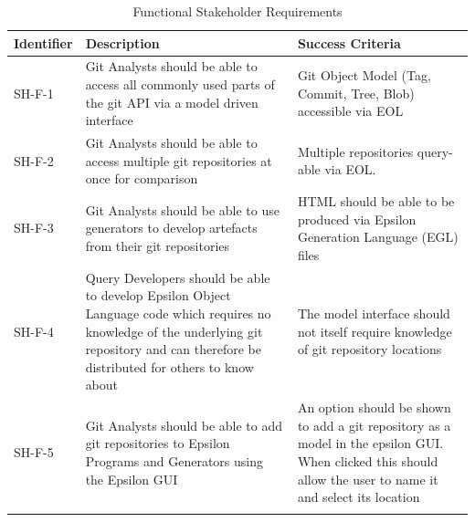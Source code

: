 \documentclass[11pt]{book}
\begin{document}
\begin{longtable}{|p{2cm}|p{7cm}|p{6cm}|}
\hline
\textbf{Identifier} & \textbf{Description} & \textbf{Success Criteria} \\ \hline
SH-F-1 & Git Analysts should be able to access all commonly used parts of the git API via a model driven interface &  Git Object Model (Tag, Commit, Tree, Blob) accessible via EOL \\ \hline
SH-F-2 & Git Analysts should be able to access multiple git repositories at once for comparison & Multiple repositories query-able via EOL.  \\ \hline
SH-F-3 & Git Analysts should be able to use generators to develop artefacts from their git repositories & HTML should be able to be produced via Epsilon Generation Language (EGL) files \\ \hline
SH-F-4 & Query Developers should be able to develop Epsilon Object Language code which requires no knowledge of the underlying git repository and can therefore be distributed for others to know about & The model interface should not itself require knowledge of git repository locations \\ \hline
SH-F-5 & Git Analysts should be able to add git repositories to Epsilon Programs and Generators using the Epsilon GUI & An option should be shown to add a git repository as a model in the epsilon GUI. When clicked this should allow the user to name it and select its location \\ \hline
\caption{Functional Stakeholder Requirements}
\label{tab:functionalstakeholderrequirements}
\end{longtable}
\end{document}
